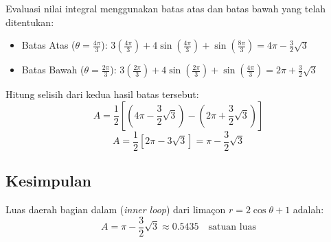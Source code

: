 \documentclass[12pt,a4paper]{article}
\begin{document}
Evaluasi nilai integral menggunakan batas atas dan batas bawah yang telah ditentukan:
\begin{itemize}
  \item Batas Atas ($\theta = \frac{4\pi}{3}$): $3\left(\frac{4\pi}{3}\right) + 4\sin\left(\frac{4\pi}{3}\right) + \sin\left(\frac{8\pi}{3}\right) = 4\pi - \frac{3}{2}\sqrt{3}$
  \item Batas Bawah ($\theta = \frac{2\pi}{3}$): $3\left(\frac{2\pi}{3}\right) + 4\sin\left(\frac{2\pi}{3}\right) + \sin\left(\frac{4\pi}{3}\right) = 2\pi + \frac{3}{2}\sqrt{3}$
\end{itemize}

Hitung selisih dari kedua hasil batas tersebut:
\[
A = \frac{1}{2} \left[ \left(4\pi - \frac{3}{2}\sqrt{3}\right) - \left(2\pi + \frac{3}{2}\sqrt{3}\right) \right]
\]
\[
A = \frac{1}{2} \left[ 2\pi - 3\sqrt{3} \right] = \pi - \frac{3}{2}\sqrt{3}
\]

\subsection*{Kesimpulan}
Luas daerah bagian dalam (\textit{inner loop}) dari lima\c{c}on $r = 2\cos\theta + 1$ adalah:
\[
A = \pi - \frac{3}{2}\sqrt{3} \approx 0.5435 \quad \text{satuan luas}
\]
\end{document}
